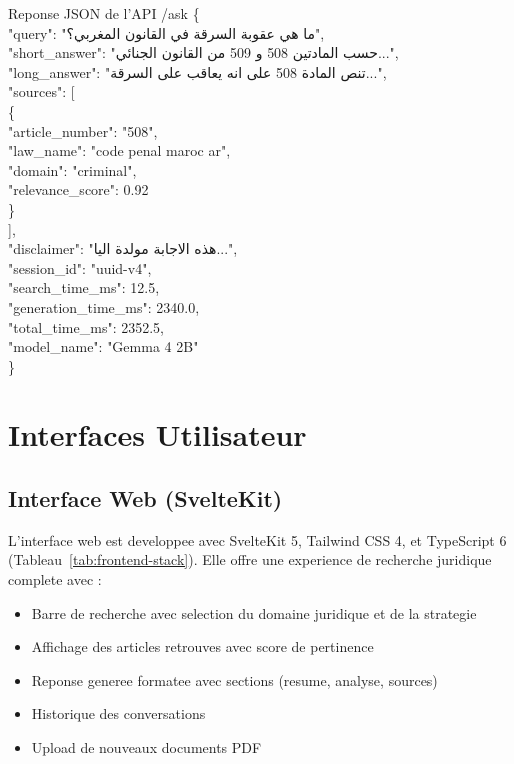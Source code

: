 \begin{jsonblock}{Reponse JSON de l'API /ask}
\{\\
\quad "query": "\textarabic{ما هي عقوبة السرقة في القانون المغربي؟}",\\
\quad "short\_answer": "\textarabic{حسب المادتين 508 و 509 من القانون الجنائي...}",\\
\quad "long\_answer": "\textarabic{تنص المادة 508 على انه يعاقب على السرقة...}",\\
\quad "sources": [\\
\qquad \{\\
\qquad\quad "article\_number": "508",\\
\qquad\quad "law\_name": "code penal maroc ar",\\
\qquad\quad "domain": "criminal",\\
\qquad\quad "relevance\_score": 0.92\\
\qquad \}\\
\quad ],\\
\quad "disclaimer": "\textarabic{هذه الاجابة مولدة اليا...}",\\
\quad "session\_id": "uuid-v4",\\
\quad "search\_time\_ms": 12.5,\\
\quad "generation\_time\_ms": 2340.0,\\
\quad "total\_time\_ms": 2352.5,\\
\quad "model\_name": "Gemma 4 2B"\\
\}
\end{jsonblock}
\label{lst:ask-response}

\section{Interfaces Utilisateur}

\subsection{Interface Web (SvelteKit)}

L'interface web est developpee avec SvelteKit 5, Tailwind CSS 4, et TypeScript 6 (Tableau~\ref{tab:frontend-stack}). Elle offre une experience de recherche juridique complete avec :

\begin{itemize}
    \item Barre de recherche avec selection du domaine juridique et de la strategie
    \item Affichage des articles retrouves avec score de pertinence
    \item Reponse generee formatee avec sections (resume, analyse, sources)
    \item Historique des conversations
    \item Upload de nouveaux documents PDF
\end{itemize}

